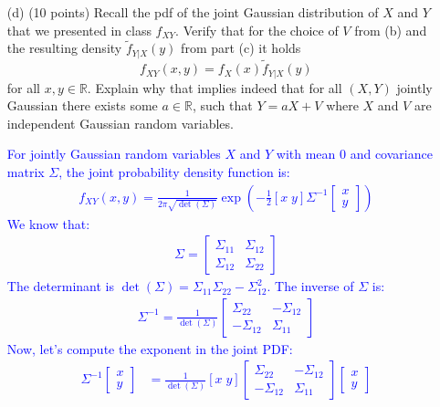\documentclass{article}
\begin{document}
\begin{enumerate}
    \item[(d)] (10 points) Recall the pdf of the joint Gaussian distribution of $X$ and $Y$ that we presented in class $f_{XY}$. Verify that for the choice of $V$ from (b) and the resulting density $\tilde{f}_{Y|X}(y)$ from part (c) it holds
    \[
    f_{XY}(x, y) = f_X(x)\tilde{f}_{Y|X}(y)
    \]
    for all $x, y \in \mathbb{R}$. Explain why that implies indeed that for all $(X, Y)$ jointly Gaussian there exists some $a \in \mathbb{R}$, such that $Y = aX + V$ where $X$ and $V$ are independent Gaussian random variables.

    \textcolor{blue}{
        For jointly Gaussian random variables $X$ and $Y$ with mean 0 and covariance matrix $\Sigma$, the joint probability density function is:
\begin{align}
f_{XY}(x,y) = \frac{1}{2\pi\sqrt{\det(\Sigma)}}\exp\left(-\frac{1}{2}[x \; y]\Sigma^{-1}\begin{bmatrix} x \\ y \end{bmatrix}\right)
\end{align}
We know that:
\begin{align}
\Sigma = \begin{bmatrix} \Sigma_{11} & \Sigma_{12} \\ \Sigma_{12} & \Sigma_{22} \end{bmatrix}
\end{align}
The determinant is $\det(\Sigma) = \Sigma_{11}\Sigma_{22} - \Sigma_{12}^2$.
The inverse of $\Sigma$ is:
\begin{align}
\Sigma^{-1} = \frac{1}{\det(\Sigma)}\begin{bmatrix} \Sigma_{22} & -\Sigma_{12} \\ -\Sigma_{12} & \Sigma_{11} \end{bmatrix}
\end{align}
Now, let's compute the exponent in the joint PDF:
\begin{align}
[x \; y]\Sigma^{-1}\begin{bmatrix} x \\ y \end{bmatrix} &= \frac{1}{\det(\Sigma)}[x \; y]\begin{bmatrix} \Sigma_{22} & -\Sigma_{12} \\ -\Sigma_{12} & \Sigma_{11} \end{bmatrix}\begin{bmatrix} x \\ y \end{bmatrix}\\

\end{align}}
\end{enumerate}
\end{document}

